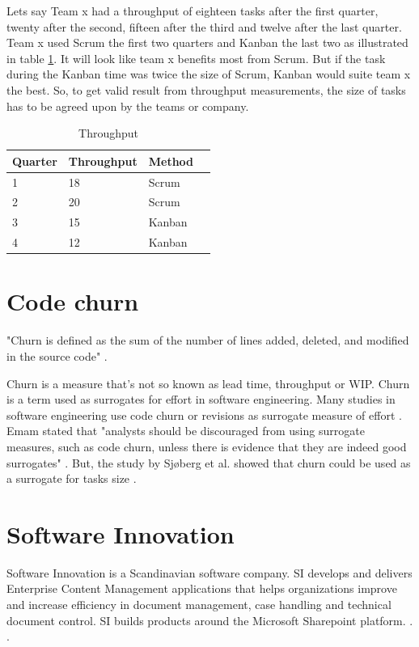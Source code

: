 \documentclass[UKenglish]{ifimaster}  %
\begin{document}
Lets say Team x had a throughput of eighteen tasks after the first quarter, twenty after the second, fifteen after the third and twelve after the last quarter. Team x used Scrum the first two quarters and Kanban the last two as illustrated in table \ref{tt}. It will look like team x benefits most from Scrum. But if the task during the Kanban time was twice the size of Scrum, Kanban would suite team x the best. So, to get valid result from throughput measurements, the size of tasks has to be agreed upon by the teams or company.
\begin{table}[ht]
\begin{center}
    \begin{tabular}{| l | l | l | l |}
    \hline
    Quarter & Throughput & Method\\ \hline
    1 & 18 & Scrum\\ \hline
    2 & 20 & Scrum \\ \hline
    3 & 15 & Kanban\\ \hline
    4 & 12 & Kanban\\ \hline
    \end{tabular}
\caption{Throughput}
\label{tt} %
\end{center}
\end{table}

\section{Code churn}
\label{sec:Churn}
"Churn is defined as the sum of the number of lines added, deleted, and modified in the source code" \parencite{Dag}.

Churn is a measure that's not so known as lead time, throughput or WIP. Churn is a term used as surrogates for effort in software engineering. Many studies in software engineering use code churn or revisions as surrogate measure of effort \parencite{yamashita2012quantifying}. Emam stated that "analysts should be discouraged from using surrogate measures, such as code churn, unless there is evidence that they are indeed good surrogates" \parencite{el2000methodology}.  But, the study by Sj\o berg et al. showed that churn could be used as a surrogate for tasks size \parencite{yamashita2012quantifying}. 


\section{Software Innovation}
\label{sec:SI}
Software Innovation is a Scandinavian software company. SI develops and delivers Enterprise Content Management applications that helps organizations improve and increase efficiency in document management, case handling and technical document control. SI builds products around the Microsoft Sharepoint platform. \parencite{Dag}. \parencite{SI}.
\end{document}
